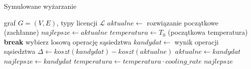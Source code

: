 \begin{algorithm}[H]
\caption{Symulowane wyżarzanie}
\label{alg:sa}
\begin{algorithmic}[1]
\Require graf $G=(V,E)$, typy licencji $\mathcal{L}$
\State $aktualne \gets$ rozwiązanie początkowe (zachłanne)
\State $najlepsze \gets aktualne$
\State $temperatura \gets T_0$ (początkowa temperatura)
   \textbf{break} \EndIf
  \State wybierz losową operację sąsiedztwa
  \State $kandydat \gets$ wynik operacji sąsiedztwa
  \State $\Delta \gets koszt(kandydat) - koszt(aktualne)$
    \State $aktualne \gets kandydat$
      \State $najlepsze \gets kandydat$
    \EndIf
  \EndIf
  \State $temperatura \gets temperatura \cdot cooling\_rate$
\EndFor
\State \Return $najlepsze$
\end{algorithmic}
\end{algorithm}

